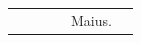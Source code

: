 \documentclass[11pt,openany]{book}
\renewcommand{\\}{\par\hspace*{1em}} %
\begin{document}
\begin{center}
\begin{tabular}{l | l | l | r | l l}
& & & & \color{Red} Maius. \\

\end{tabular}
\end{center}
\end{document}
